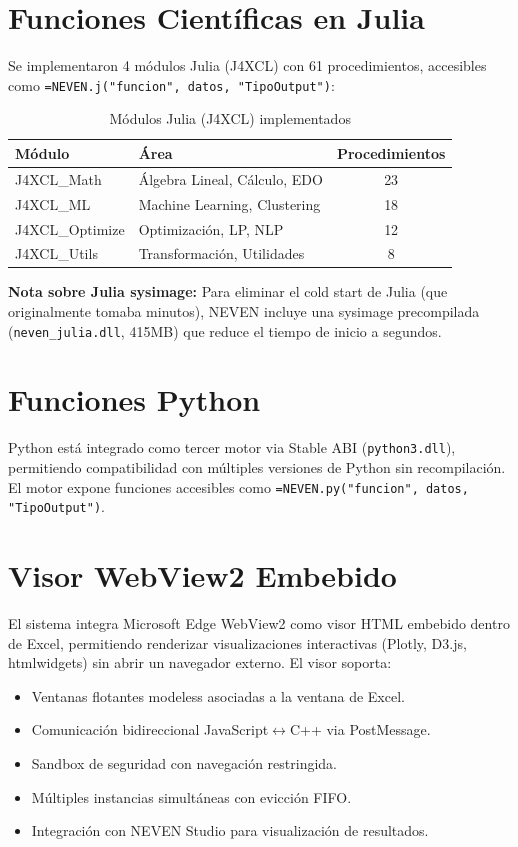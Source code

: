 \documentclass[12pt, a4paper]{report}
\begin{document}
\section{Funciones Científicas en Julia}

Se implementaron 4 módulos Julia (J4XCL) con 61 procedimientos, accesibles como \texttt{=NEVEN.j("funcion", datos, "TipoOutput")}:

\begin{table}[H]
\centering
\begin{tabular}{llc}
\toprule
\textbf{Módulo} & \textbf{Área} & \textbf{Procedimientos} \\
\midrule
J4XCL\_Math & Álgebra Lineal, Cálculo, EDO & 23 \\
J4XCL\_ML & Machine Learning, Clustering & 18 \\
J4XCL\_Optimize & Optimización, LP, NLP & 12 \\
J4XCL\_Utils & Transformación, Utilidades & 8 \\
\bottomrule
\end{tabular}
\caption{Módulos Julia (J4XCL) implementados}
\end{table}

\textbf{Nota sobre Julia sysimage:} Para eliminar el cold start de Julia (que originalmente tomaba minutos), NEVEN incluye una sysimage precompilada (\texttt{neven\_julia.dll}, 415MB) que reduce el tiempo de inicio a segundos.

\section{Funciones Python}

Python está integrado como tercer motor via Stable ABI (\texttt{python3.dll}), permitiendo compatibilidad con múltiples versiones de Python sin recompilación. El motor expone funciones accesibles como \texttt{=NEVEN.py("funcion", datos, "TipoOutput")}.

\section{Visor WebView2 Embebido}

El sistema integra Microsoft Edge WebView2 como visor HTML embebido dentro de Excel, permitiendo renderizar visualizaciones interactivas (Plotly, D3.js, htmlwidgets) sin abrir un navegador externo. El visor soporta:

\begin{itemize}
    \item Ventanas flotantes modeless asociadas a la ventana de Excel.
    \item Comunicación bidireccional JavaScript$\leftrightarrow$C++ via PostMessage.
    \item Sandbox de seguridad con navegación restringida.
    \item Múltiples instancias simultáneas con evicción FIFO.
    \item Integración con NEVEN Studio para visualización de resultados.
\end{itemize}
\end{document}

